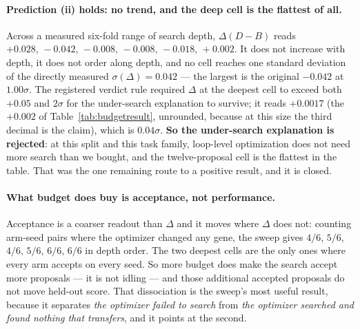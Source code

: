\documentclass[11pt]{article}
\newcommand{\dd}{\ensuremath{\Delta}}
\begin{document}
\paragraph{Prediction (ii) holds: no trend, and the deep cell is the flattest of all.} Across a
measured six-fold range of search depth, $\dd(D-B)$ reads
$+0.028,\,-0.042,\,-0.008,\,-0.008,\,-0.018,\,+0.002$. It does not increase with depth, it does
not order along depth, and no cell reaches one standard deviation of the directly measured
$\sigma(\dd)=0.042$ --- the largest is the original $-0.042$ at $1.00\sigma$. The registered
verdict rule required $\dd$ at the deepest cell to exceed both $+0.05$ and $2\sigma$ for the
under-search explanation to survive; it reads $+0.0017$ (the $+0.002$ of
Table~\ref{tab:budgetresult}, unrounded, because at this size the third decimal is the claim),
which is $0.04\sigma$. \textbf{So the
under-search explanation is rejected}: at this split and this task family, loop-level
optimization does not need more search than we bought, and the twelve-proposal cell is the
flattest in the table. That was the one remaining route to a positive result, and it is closed.

\paragraph{What budget does buy is acceptance, not performance.} Acceptance is a coarser readout
than $\dd$ and it moves where $\dd$ does not: counting arm-seed pairs where the optimizer changed
any gene, the sweep gives $4/6$, $5/6$, $4/6$, $5/6$, $6/6$, $6/6$ in depth order. The two
deepest cells are the only ones where every arm accepts on every seed. So more budget does make
the search accept more proposals --- it is not idling --- and those additional accepted proposals
do not move held-out score. That dissociation is the sweep's most useful result, because it
separates \emph{the optimizer failed to search} from \emph{the optimizer searched and found
nothing that transfers}, and it points at the second.
\end{document}
